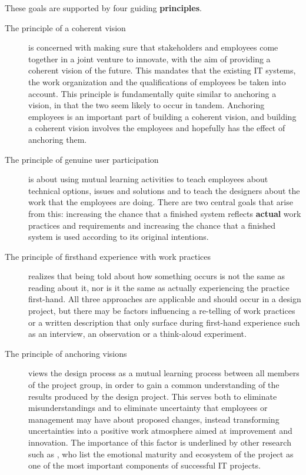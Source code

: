 These goals are supported by four guiding \textbf{principles}.
\begin{description}
    \item [The principle of a coherent vision] is concerned with making sure that stakeholders
        and employees come together in a joint venture to innovate, with the aim
        of providing a coherent vision of the future. This mandates that the existing IT systems, 
        the work organization  and the qualifications of employees be taken into
        account. This principle is fundamentally quite similar to anchoring a
        vision, in that the two seem likely to occur in tandem. Anchoring
        employees is an important part of building a coherent vision, and
        building a coherent vision involves the employees and hopefully has the
        effect of anchoring them.
    \item [The principle of genuine user participation] is about using mutual learning activities
        to teach employees about technical options, issues and solutions and to
        teach the designers about the work that the employees are doing. There are
        two central goals that arise from this: increasing the chance that a
        finished system reflects \textbf{actual} work practices and
        requirements and increasing the chance that a finished system is used
        according to its original intentions.
    \item [The principle of firsthand experience with work practices] realizes that being told
        about how something occurs is not the same as reading about it, nor is
        it the same as actually experiencing the practice first-hand. All three
        approaches are applicable and should occur in a design project, but
        there may be factors influencing a re-telling of work practices or a
        written description that only surface during first-hand experience such
        as an interview, an observation or a think-aloud experiment.
    \item [The principle of anchoring visions] views the design process as a mutual learning
        process between all members of the project group, in order to gain a
        common understanding of the results produced by the design
        project\cite{bodker2004participatory}. This serves both to eliminate
        misunderstandings and to eliminate uncertainty that employees or management
        may have about proposed changes, instead transforming uncertainties into
        a positive work atmosphere aimed at improvement and innovation. The
        importance of this factor is underlined by other research such as
        \cite{standish20012}, who list the emotional maturity and ecosystem of
        the project as one of the most important components of successful IT
        projects.
\end{description}

